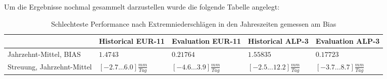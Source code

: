 Um die Ergebnisse nochmal gesammelt darzustellen wurde die folgende Tabelle angelegt:
\begin{table}[h]
	\begin{tabularx}{\textwidth}{X|X|X|X|X|}
		\hline
		& \textbf{Historical EUR-11} & \textbf{Evaluation EUR-11}& \textbf{Historical ALP-3} & \textbf{Evaluation ALP-3}\\
		\hline
		Jahrzehnt-Mittel, BIAS& $1.4743$ & $0.21764$ & $1.55835$ & \cellcolor{YellowGreen}$0.17723$\\
		\hline
		Streuung, Jahrzehnt-Mittel & $[-2.7...6.0]\frac{mm}{Tag}$ & \cellcolor{YellowGreen}$[-4.6...3.9]\frac{mm}{Tag}$ &$[-2.5...12.2]\frac{mm}{Tag}$& $[-3.7...8.7]\frac{mm}{Tag}$\\
		\hline
	\end{tabularx}
	\caption{Schlechteste Performance nach Extremniederschlägen in den Jahreszeiten gemessen am Bias}
	\label{tab:appendix}
\end{table}